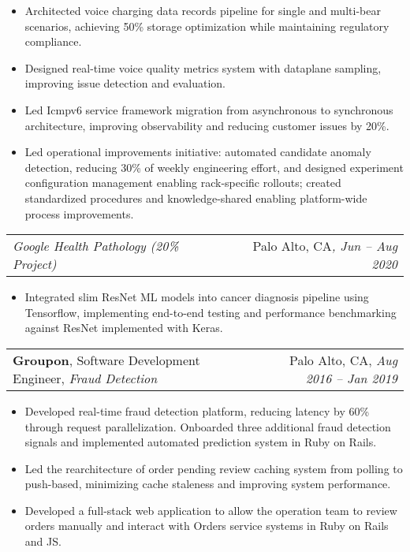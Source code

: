 \documentclass[letterpaper,11pt]{article}
\makeatletter
\newcommand{\resumeItem}[1]{
  \item\small{
    {#1 \vspace{-3pt}}
  }
}
\newcommand{\resumeSubheading}[5]{
  \vspace{-1pt}\item
    \begin{tabular*}{0.97\textwidth}[t]{l@{\extracolsep{\fill}}r}
      \textbf{#1}{\small, #2, \textit{#3}} &  {\small#4}{, \textit{\small #5}} \\
    \end{tabular*}
    \vspace{-7pt}
}
\newcommand{\resumeSubSubheadingMultiteam}[4]{
    \begin{tabular*}{0.97\textwidth}{l@{\extracolsep{\fill}}r}
      \textit{\small#1}{ \scriptsize #4} & {\small#2}\textit{\small, #3} \\
    \end{tabular*}
    \vspace{-7pt}
}
\newcommand{\resumeItemListStart}{\begin{itemize}[leftmargin=*]}
\newcommand{\resumeItemListEnd}{\end{itemize}\vspace{-5pt}}
\makeatother
\begin{document}
      \resumeItemListStart
\resumeItem{Architected voice charging data records pipeline for single and multi-bear scenarios, achieving 50\% storage optimization while maintaining regulatory compliance.}
\resumeItem{Designed real-time voice quality metrics system with dataplane sampling, improving issue detection and evaluation.} %
\resumeItem{Led Icmpv6 service framework migration from asynchronous to synchronous architecture, improving observability and reducing customer issues by 20\%.}
\resumeItem{Led operational improvements initiative: automated candidate anomaly detection, reducing 30\% of weekly engineering effort, and designed experiment configuration management enabling rack-specific rollouts; created standardized procedures and knowledge-shared enabling platform-wide process improvements.}
      \resumeItemListEnd

  \resumeSubSubheadingMultiteam
   {Google Health Pathology (20\% Project)}{Palo Alto, CA}{Jun -- Aug 2020}{}
      \resumeItemListStart
\resumeItem{Integrated slim ResNet ML models into cancer diagnosis pipeline using Tensorflow, implementing end-to-end testing and performance benchmarking against ResNet implemented with Keras.}
      \resumeItemListEnd

    \resumeSubheading
      {Groupon}{Software Development Engineer}{Fraud Detection}
      {Palo Alto, CA}{Aug 2016 -- Jan 2019}
      
      \resumeItemListStart
        \resumeItem{Developed real-time fraud detection platform, reducing latency by 60\% through request parallelization. Onboarded three additional fraud detection signals and implemented automated prediction system in Ruby on Rails.}
        \resumeItem{
        Led the rearchitecture of order pending review caching system from polling to push-based, minimizing cache staleness and improving system performance.}
        \resumeItem{Developed a full-stack web application to allow the operation team to review orders manually and interact with Orders service systems in Ruby on Rails and JS.}
      \resumeItemListEnd
\end{document}

